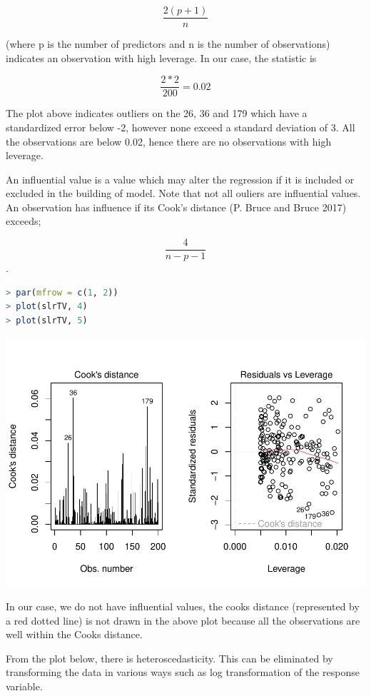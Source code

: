 \documentclass[
]{article}
\begin{document}
\[\frac{2(p+1)}{n}\]

(where p is the number of predictors and n is the number of
observations) indicates an observation with high leverage. In our case,
the statistic is

\[\frac{2*2}{200}=0.02\]

The plot above indicates outliers on the 26, 36 and 179 which have a
standardized error below -2, however none exceed a standard deviation of
3. All the observations are below 0.02, hence there are no observations
with high leverage.

An influential value is a value which may alter the regression if it is
included or excluded in the building of model. Note that not all ouliers
are influential values. An observation has influence if its Cook's
distance (P. Bruce and Bruce 2017) exceeds;

\[\frac{4}{n-p-1}\].

\begin{lstlisting}[language=R]
> par(mfrow = c(1, 2))
> plot(slrTV, 4)
> plot(slrTV, 5)
\end{lstlisting}

\includegraphics{LinearRegression_files/figure-latex/unnamed-chunk-18-1.pdf}

In our case, we do not have influential values, the cooks distance
(represented by a red dotted line) is not drawn in the above plot
because all the observations are well within the Cooks distance.

From the plot below, there is heteroscedasticity. This can be eliminated
by transforming the data in various ways such as log transformation of
the response variable.
\end{document}
